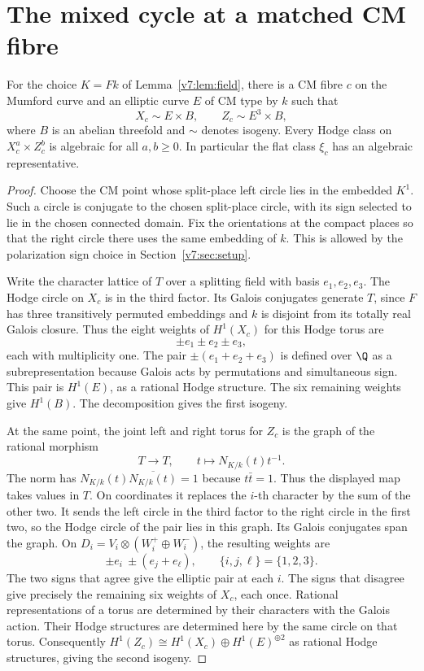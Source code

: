 \section{The mixed cycle at a matched CM fibre}\label{v7:sec:seed}

\begin{theorem}\label{v7:thm:seed}
For the choice \(K=Fk\) of Lemma~\ref{v7:lem:field}, there is a CM fibre \(c\) on the Mumford curve and an elliptic curve \(E\) of CM type by \(k\) such that
\[
 X_c\sim E\times B,\qquad Z_c\sim E^3\times B,
\]
where \(B\) is an abelian threefold and \(\sim\) denotes isogeny. Every Hodge class on \(X_c^a\times Z_c^b\) is algebraic for all \(a,b\ge0\). In particular the flat class \(\xi_c\) has an algebraic representative.
\end{theorem}

\begin{proof}
Choose the CM point whose split-place left circle lies in the embedded \(K^1\). Such a circle is conjugate to the chosen split-place circle, with its sign selected to lie in the chosen connected domain. Fix the orientations at the compact places so that the right circle there uses the same embedding of \(k\). This is allowed by the polarization sign choice in Section~\ref{v7:sec:setup}.

Write the character lattice of \(T\) over a splitting field with basis \(e_1,e_2,e_3\). The Hodge circle on \(X_c\) is in the third factor. Its Galois conjugates generate \(T\), since \(F\) has three transitively permuted embeddings and \(k\) is disjoint from its totally real Galois closure. Thus the eight weights of \(H^1(X_c)\) for this Hodge torus are
\[
 \pm e_1\pm e_2\pm e_3 ,
\]
each with multiplicity one. The pair \(\pm(e_1+e_2+e_3)\) is defined over \(\Q\) as a subrepresentation because Galois acts by permutations and simultaneous sign. This pair is \(H^1(E)\), as a rational Hodge structure. The six remaining weights give \(H^1(B)\). The decomposition gives the first isogeny.

At the same point, the joint left and right torus for \(Z_c\) is the graph of the rational morphism
\[
 T\longrightarrow T,\qquad t\longmapsto N_{K/k}(t)t^{-1}.
\]
The norm has \(N_{K/k}(t)\overline{N_{K/k}(t)}=1\) because \(t\bar t=1\). Thus the displayed map takes values in \(T\). On coordinates it replaces the \(i\)-th character by the sum of the other two. It sends the left circle in the third factor to the right circle in the first two, so the Hodge circle of the pair lies in this graph. Its Galois conjugates span the graph. On \(D_i=V_i\otimes(W_i^+\oplus W_i^-)\), the resulting weights are
\[
 \pm e_i\ \pm(e_j+e_\ell),\qquad \{i,j,\ell\}=\{1,2,3\}.
\]
The two signs that agree give the elliptic pair at each \(i\). The signs that disagree give precisely the remaining six weights of \(X_c\), each once. Rational representations of a torus are determined by their characters with the Galois action. Their Hodge structures are determined here by the same circle on that torus. Consequently \(H^1(Z_c)\cong H^1(X_c)\oplus H^1(E)^{\oplus2}\) as rational Hodge structures, giving the second isogeny.


\end{proof}
